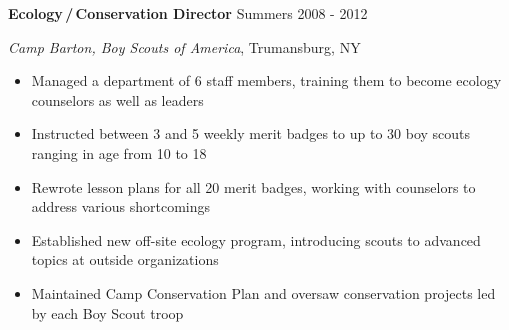 
\vspace{7pt}

\textbf{Ecology\,/\,Conservation Director} \hfill Summers 2008 - 2012

\textit{Camp Barton, Boy Scouts of America}, Trumansburg, NY

\begin{itemize}
    \item Managed a department of 6 staff members, training them to become ecology counselors as well as leaders
    \item Instructed between 3 and 5 weekly merit badges to up to 30 boy scouts ranging in age from 10 to 18
    \item Rewrote lesson plans for all 20 merit badges, working with counselors to address various shortcomings
    \item Established new off-site ecology program, introducing scouts to advanced topics at outside organizations
    \item Maintained Camp Conservation Plan and oversaw conservation projects led by each Boy Scout troop
\end{itemize}
